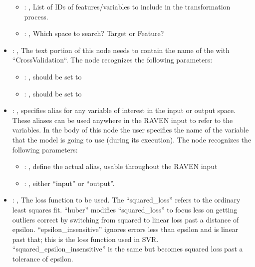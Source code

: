 \begin{itemize}
\begin{itemize}
        \item {}: , 
          List of IDs of features/variables to include in the transformation process.

        \item {}: , 
          Which space to search? Target or Feature?
      \end{itemize}

    \item {}: , 
      The text portion of this node needs to contain the name of the  with
               ``CrossValidation``.
      The  node recognizes the following parameters:
        \begin{itemize}
          \item {}: , 
            should be set to 
          \item {}: , 
            should be set to 
      \end{itemize}

    \item {}: , 
      specifies alias for         any variable of interest in the input or output space. These
      aliases can be used anywhere in the RAVEN input to         refer to the variables. In the body
      of this node the user specifies the name of the variable that the model is going to use
      (during its execution).
      The  node recognizes the following parameters:
        \begin{itemize}
          \item {}: , 
            define the actual alias, usable throughout the RAVEN input
          \item {}: , 
            either ``input'' or ``output''.
      \end{itemize}

    \item {}: , 
      The loss function to be used.                                                  The
      ``squared\_loss'' refers to the ordinary least squares fit. ``huber'' modifies
      ``squared\_loss'' to focus less on getting outliers correct by
      switching from squared to linear loss past a distance of epsilon. ``epsilon\_insensitive''
      ignores errors less than epsilon and is linear past
      that; this is the loss function used in SVR. ``squared\_epsilon\_insensitive'' is the same but
      becomes squared loss past a tolerance of epsilon.


\end{itemize}
